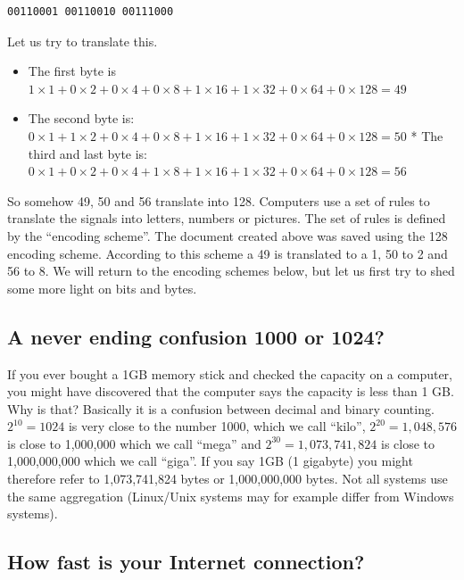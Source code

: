 \documentclass[
]{book}
\providecommand{\tightlist}{%
  \setlength{\itemsep}{0pt}\setlength{\parskip}{0pt}}
\begin{document}
\begin{verbatim}
00110001 00110010 00111000
\end{verbatim}

Let us try to translate this.

\begin{itemize}
\tightlist
\item
  The first byte is \(1 \times 1+0\times 2+0\times 4 +0\times 8 +1\times 16 +1\times 32 +0\times 64 +0\times 128=49\)
\item
  The second byte is: \(0 \times 1+1\times 2+0\times 4 +0\times 8 +1\times 16 +1\times 32 +0\times 64 +0\times 128=50\) * The third and last byte is: \(0 \times 1+0\times 2+0\times 4 +1\times 8 +1\times 16 +1\times 32 +0\times 64 +0\times 128=56\)
\end{itemize}

So somehow 49, 50 and 56 translate into 128. Computers use a set of rules to translate the signals into letters, numbers or pictures. The set of rules is defined by the ``encoding scheme''. The document created above was saved using the 128 encoding scheme. According to this scheme a 49 is translated to a 1, 50 to 2 and 56 to 8. We will return to the encoding schemes below, but let us first try to shed some more light on bits and bytes.

\hypertarget{a-never-ending-confusion-1000-or-1024}{%
\subsection*{A never ending confusion 1000 or 1024?}\label{a-never-ending-confusion-1000-or-1024}}

If you ever bought a 1GB memory stick and checked the capacity on a computer, you might have discovered that the computer says the capacity is less than 1 GB. Why is that? Basically it is a confusion between decimal and binary counting. \(2^{10}=1024\) is very close to the number 1000, which we call ``kilo'', \(2^{20}=1,048,576\) is close to 1,000,000 which we call ``mega'' and \(2^{30}=1,073,741,824\) is close to 1,000,000,000 which we call ``giga''. If you say 1GB (1 gigabyte) you might therefore refer to 1,073,741,824 bytes or 1,000,000,000 bytes. Not all systems use the same aggregation (Linux/Unix systems may for example differ from Windows systems).

\hypertarget{how-fast-is-your-internet-connection}{%
\subsection*{How fast is your Internet connection?}\label{how-fast-is-your-internet-connection}}
\end{document}
